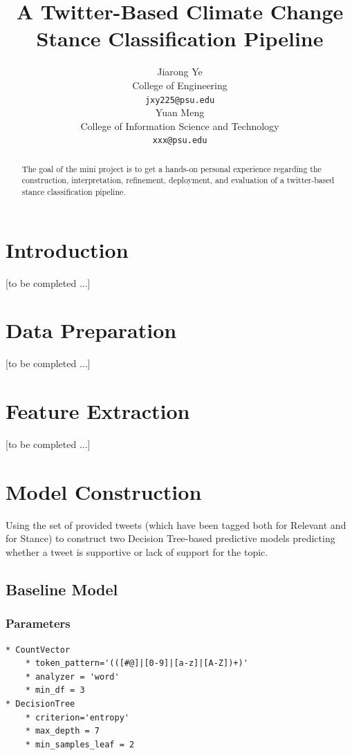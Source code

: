 \documentclass{article} %
\title{A Twitter-Based Climate Change Stance Classification Pipeline}
\author{
Jiarong Ye\\
College of Engineering\\
\texttt{jxy225@psu.edu} \\
\And
Yuan Meng\\
College of Information Science and Technology\\
\texttt{xxx@psu.edu} \\
}
\begin{document}
\maketitle

\begin{abstract}
The goal of the mini project is to get a hands-on personal experience regarding the construction, interpretation, refinement, deployment, and evaluation of a twitter-based stance classification pipeline.
\end{abstract}

\section{Introduction}

[to be completed ...]

\section{Data Preparation}


[to be completed ...]


\section{Feature Extraction}


[to be completed ...]

\section{Model Construction}

Using the set of provided tweets (which have been tagged both for Relevant and for Stance) to construct two Decision Tree-based predictive models predicting whether a tweet is supportive or lack of support for the topic.

\subsection{Baseline Model}

\subsubsection{Parameters}

\lstset{language=Python}
\lstset{frame=lines}
\lstset{basicstyle=\footnotesize}
\begin{lstlisting}
* CountVector
	* token_pattern='(([#@]|[0-9]|[a-z]|[A-Z])+)'
	* analyzer = 'word'
	* min_df = 3
* DecisionTree
	* criterion='entropy'
	* max_depth = 7
	* min_samples_leaf = 2
\end{lstlisting}
\end{document}
